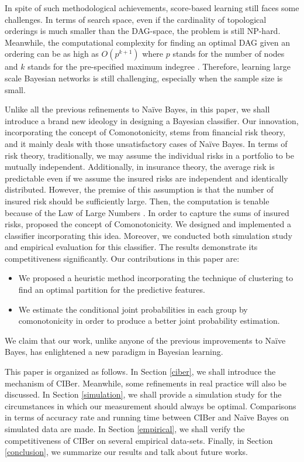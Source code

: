 \documentclass[twoside,11pt]{article}
\begin{document}
In spite of such methodological achievements, score-based learning still faces some challenges. In terms of search space, even if the cardinality of topological orderings is much smaller than the DAG-space, the problem is still NP-hard. Meanwhile, the computational complexity for finding an optimal DAG given an ordering can be as high as $O(p^{k+1})$ where $p$ stands for the number of nodes and $k$ stands for the pre-specified maximum indegree \citep{ye2020optimizing}. Therefore, learning large scale Bayesian networks is still challenging, especially when the sample size is small.



Unlike all the previous refinements to Na\"ive Bayes, in this paper, we shall introduce a brand new ideology in designing a Bayesian classifier. Our innovation, incorporating the concept of Comonotonicity, stems from financial risk theory, and it mainly deals with those unsatisfactory cases of Na\"ive Bayes. In terms of risk theory, traditionally, we may assume the individual risks in a portfolio to be mutually independent. Additionally, in insurance theory, the average risk is predictable even if we assume the insured risks are independent and identically distributed. However, the premise of this assumption is that the number of insured risk should be sufficiently large. Then, the computation is tenable because of the Law of Large Numbers \citep{dhaene2002concept}. In order to capture the sums of insured risks, \citet{dhaene2002concept} proposed the concept of Comonotonicity. We designed and implemented a classifier incorporating this idea. Moreover, we conducted both simulation study and empirical evaluation for this classifier. The results demonstrate its competitiveness significantly. Our contributions in this paper are:
\begin{itemize}
    \item We proposed a heuristic method incorporating the technique of clustering to find an optimal partition for the predictive features.
    \item We estimate the conditional joint probabilities in each group by comonotonicity in order to produce a better joint probability estimation.
\end{itemize}
We claim that our work, unlike anyone of the previous improvements to Na\"ive Bayes, has enlightened a new paradigm in Bayesian learning.

This paper is organized as follows. In Section \ref{ciber}, we shall introduce the mechanism of CIBer. Meanwhile, some refinements in real practice will also be discussed. In Section \ref{simulation}, we shall provide a simulation study for the circumstances in which our measurement should always be optimal. Comparisons in terms of accuracy rate and running time between CIBer and Na\"ive Bayes on simulated data are made. In Section \ref{empirical}, we shall verify the competitiveness of CIBer on several empirical data-sets. Finally, in Section \ref{conclusion}, we summarize our results and talk about future works.
\end{document}

